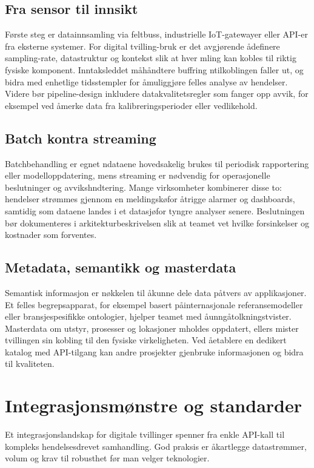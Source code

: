 \subsection{Fra sensor til innsikt}
F\o rste steg er datainnsamling via feltbuss, industrielle IoT-gatewayer eller API-er fra eksterne systemer. For digital tvilling-bruk er det avgj\o rende \aa definere sampling-rate, datastruktur og kontekst slik at hver m\a ling kan kobles til riktig fysiske komponent. Inntaksleddet m\aa h\aa ndtere buffring n\aar tilkoblingen faller ut, og bidra med enhetlige tidsstempler for \aa muliggj\o re felles analyse av hendelser. Videre b\o r pipeline-design inkludere datakvalitetsregler som fanger opp avvik, for eksempel ved \aa merke data fra kalibreringsperioder eller vedlikehold.

\subsection{Batch kontra streaming}
Batchbehandling er egnet n\aar dataene hovedsakelig brukes til periodisk rapportering eller modelloppdatering, mens streaming er n\o dvendig for operasjonelle beslutninger og avviksh\a ndtering. Mange virksomheter kombinerer disse to: hendelser str\o mmes gjennom en meldingsk\o for \aa trigge alarmer og dashboards, samtidig som dataene landes i et datasj\o for tyngre analyser senere. Beslutningen b\o r dokumenteres i arkitekturbeskrivelsen slik at teamet vet hvilke forsinkelser og kostnader som forventes.

\subsection{Metadata, semantikk og masterdata}
Semantisk informasjon er n\o kkelen til \aa kunne dele data p\aa tvers av applikasjoner. Et felles begrepsapparat, for eksempel basert p\aa internasjonale referansemodeller eller bransjespesifikke ontologier, hjelper teamet med \aa unng\aa tolkningstvister. Masterdata om utstyr, prosesser og lokasjoner m\a holdes oppdatert, ellers mister tvillingen sin kobling til den fysiske virkeligheten. Ved \aa etablere en dedikert katalog med API-tilgang kan andre prosjekter gjenbruke informasjonen og bidra til kvaliteten.

\section{Integrasjonsm\o nstre og standarder}
Et integrasjonslandskap for digitale tvillinger spenner fra enkle API-kall til kompleks hendelsesdrevet samhandling. God praksis er \aa kartlegge datastr\o mmer, volum og krav til robusthet f\o r man velger teknologier.

